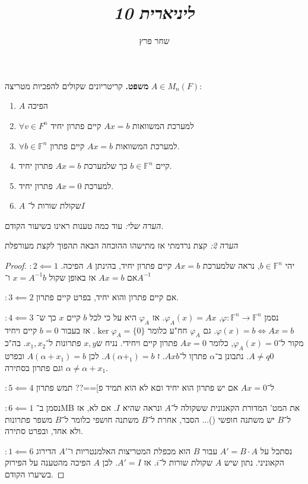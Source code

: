\documentclass[]{article}
\author{שחר פרץ}
\title{\textit{ליניארית 10}}
\newcommand\F         {\mathbb{F}}
\newcommand\co        {\colon}
\newcommand\ag        {\alpha}
\newcommand\op    {^{-1}}
\renewcommand\phi     {\varphi}
\begin{document}
	\maketitle
	\section{}
	\textbf{משפט. }קריטריונים שקולים להפכיות מטריצה $A \in M_n(F)$: 
	\begin{multicols}{2}
		\begin{enumerate}
			\item $A$ הפיכה
			\item $\forall v \in F^n$ למערכת המשוואות $Ax = b$ קיים פתרון יחיד
			\item $\forall b \in \F^n$ למערכת המשוואות $Ax = b$ קיים פתרון. 
			\item קיים $b \in \F^n$ כך שלמערכת $Ax = b$ פתרון יחיד. 
			\item למערכת $Ax = 0$ פתרון יחיד. 
			\item $A$ שקולת שורות ל־$I$
		\end{enumerate}
	\end{multicols}
	
	\textit{הערה שלי: }עוד כמה טענות ראינו בשיעור הקודם. 
	
	\textit{הערה 2: }קצת נרדמתי אז מתישהו ההוכחה הבאה תהפוך לקצת מעורפלת
	
	
	\begin{proof}
		\item[$\co 2 \impliedby 1$] יהי $b \in \F^n$, נראה שלמערכת $Ax = b$ קיים פתרון יחיד, בהינתן $A$ הפיכה. אם $Ax = b$ אז באופן שקול $x = A\op b$ ו־$A\op$ 
		\item[$\co 3 \impliedby 2$] אם קיים פתרון והוא יחיד, בפרט קיים פתרון. 
		\item[$\co 4 \impliedby 3$] נסמן $\phi \co \F^n \to \F^n$, $\phi_A(x) = Ax$. אז $\phi_A$ היא על כי לכל $b$ קיים $x$ כך ש־$\phi(x) = b \iff Ax = b$. גם $\phi_A$ חח"ע כלומר $\ker\phi_A = \{0\}$. אז בעבור $b = 0$ קיים ויחיד מקור ל־$\phi_A(x) = 0$, כלומר $Ax = 0$ פתרון קיים ויחידי. נניח ש‏$x, y$ פתרונות ל־$x_1, x_2$. בה"כ $A \neq q0$. נתבונן ב־$\ag$ פתרןו ל־$Ax b$. ז $A(\ag + _1) = b$. לכן $A(\ag + x_1) = b$ ובפרט $\ag \neq \ag + x_1$ וגם פתרון בסתירה.
		\item [$\co 5 \impliedby 4$]ל־$Ax = 0$ אם יש פתרון הוא יחיד וםא לא הוא תמיד פ]==?? תמש פתרון
		\item [$\co 6 \impliedby 1$] נסמן ב־MB את המט' המדורת הקאנונית ששקולה ל־$A$ ונראה שהיא $I$. אם לא, אז ל־$B$ יש משתנה חופשי ()... הסבר, אחרת ל־$B$ משתנה חושפי כלומר ל־$B$ משפר פתרונות ולא אחד, ובפרט סתירה. 
		\item[$\co 1 \impliedby 6$] נסתכל על $A' = B \cdot A$ עבור $B$ הוא מכפלת המטריצות האלמנטריות ו־$A'$ הדירוג הקאוניני. נתון שיש $A$ שקולת שורות ל־$i$. אז $A' = I$. לכן $A$ הפיכה מהטענה על הפירוק בשיערו הקודם. 
	\end{proof}
	
\end{document}
